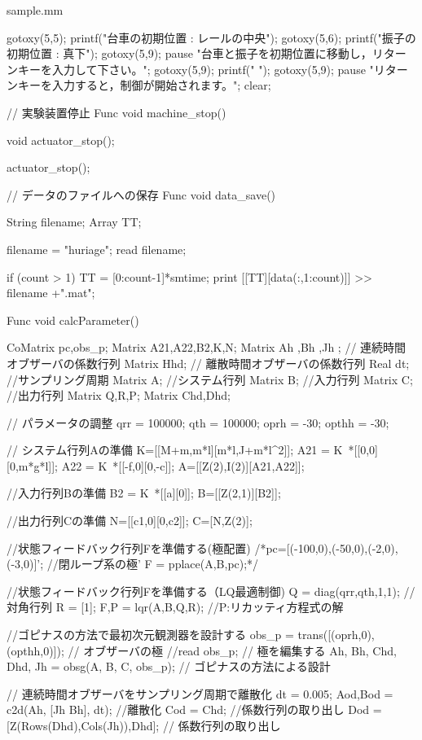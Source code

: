 \begin{itembox}[l]{sample.mm}
\begin{verbatimtab}[4]
{	gotoxy(5,5);
	printf("台車の初期位置 : レールの中央");
	gotoxy(5,6);
	printf("振子の初期位置 : 真下");
	gotoxy(5,9);
	pause "台車と振子を初期位置に移動し，リターンキーを入力して下さい。";
	gotoxy(5,9);
	printf("                                                            ");
	gotoxy(5,9);
	pause "リターンキーを入力すると，制御が開始されます。";
	clear;
}

// 実験装置停止
Func void machine_stop()
{
	void actuator_stop();

	actuator_stop();
}

// データのファイルへの保存
Func void data_save()
{
	String filename;
	Array TT;

	filename = "huriage";
	read filename;

	if (count > 1) {
		TT = [0:count-1]*smtime;
		print [[TT][data(:,1:count)]] >> filename +".mat";
	}
}

Func void calcParameter(){

    CoMatrix pc,obs_p;
    Matrix A21,A22,B2,K,N;
	Matrix Ah ,Bh ,Jh ; // 連続時間オブザーバの係数行列
	Matrix Hhd; // 離散時間オブザーバの係数行列
	Real dt; //サンプリング周期
	Matrix A; //システム行列
	Matrix B; //入力行列
	Matrix C; //出力行列
	Matrix Q,R,P;
	Matrix Chd,Dhd;

    
	// パラメータの調整
	qrr = 100000;
	qth = 100000;
	oprh = -30;
	opthh = -30;

    // システム行列Aの準備
    K=[[M+m,m*l][m*l,J+m*l^2]];
	A21 = K~*[[0,0][0,m*g*l]];
	A22 = K~*[[-f,0][0,-c]];
	A=[[Z(2),I(2)][A21,A22]];

    //入力行列Bの準備
	B2 = K~*[[a][0]];
	B=[[Z(2,1)][B2]];

	//出力行列Cの準備
    N=[[c1,0][0,c2]];
    C=[N,Z(2)];

	//状態フィードバック行列Fを準備する(極配置)
    /*pc=[(-100,0),(-50,0),(-2,0),(-3,0)]'; //閉ループ系の極'
    F = pplace(A,B,pc);*/

    //状態フィードバック行列Fを準備する（LQ最適制御)
    Q = diag(qrr,qth,1,1); // 対角行列
    R = [1];
    {F,P} = lqr(A,B,Q,R); //P:リカッティ方程式の解

	//ゴピナスの方法で最初次元観測器を設計する
	obs_p = trans([(oprh,0), (opthh,0)]); // オブザーバの極
	//read obs_p; // 極を編集する
	{Ah, Bh, Chd, Dhd, Jh} = obsg(A, B, C, obs_p); // ゴピナスの方法による設計

	// 連続時間オブザーバをサンプリング周期で離散化
	dt = 0.005;
	{Aod,Bod} = c2d(Ah, [Jh Bh], dt); //離散化
	Cod = Chd; //係数行列の取り出し
	Dod = [Z(Rows(Dhd),Cols(Jh)),Dhd]; // 係数行列の取り出し
}


\end{verbatimtab}
\end{itembox}

